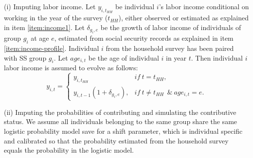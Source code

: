 \documentclass{article}
\begin{document}
\begin{enumerate}
    (i) Imputing labor income. Let $y_{i,t_{HH}}$ be individual $i$'s labor income conditional on working in the year of the survey ($t_{HH}$), either observed or estimated as explained in item \ref{item:income1}. Let $\delta_{g_i,e}$ be the growth of labor income of individuals of group $g_i$ at age $e$, estimated from social security records as explained in item \ref{item:income-profile}. 
    Individual $i$ from the household survey has been paired with SS group $g_i$. Let $age_{i,t}$ be the age of individual $i$ in year $t$. Then individual $i$ labor income is assumed to evolve as follows:
    \begin{equation} \label{eq:income_profiles}
        y_{i,t}= \left\{\begin{array}{ll}
            y_{i,t_{HH}} & if \ t = t_{HH}, \\
            y_{i,t-1} (1+\delta_{g_i,e}),&  if  \ t \neq t_{HH} \ \ \& \ age_{i,t}=e. 
        \end{array} \right .
    \end{equation}
    
    (ii) Imputing the probabilities of contributing and simulating the contributive status. We assume all individuals belonging to the same group share the same logistic probability model save for a shift parameter, which is individual specific and calibrated so that the probability estimated from the household survey equals the probability in the logistic model.  
    

\end{enumerate}
\end{document}
